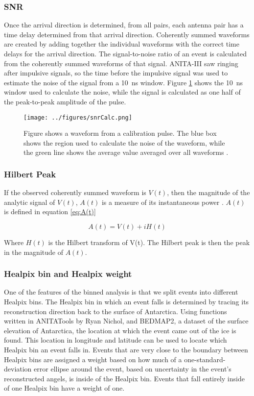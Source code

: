 \subsubsection{SNR}

Once the arrival direction is determined, from all pairs, each antenna pair has a time delay determined from that arrival direction.  Coherently summed waveforms are created by adding together the individual waveforms with the correct time delays for the arrival direction. The signal-to-noise ratio of an event is calculated from the coherently summed waveforms of that signal.  ANITA-III saw ringing after impulsive signals, so the time before the impulsive signal was used to estimate the noise of the signal from a 10~ns window.  Figure \ref{fig:snrCalc} shows the 10~ns window used to calculate the noise, while the signal is calculated as one half of the peak-to-peak amplitude of the pulse.

\begin{figure}[h]
\centering
\texttt{[image: ../figures/snrCalc.png]}
\caption[SNR Noise and Signal Sampling]{Figure shows a waveform from a calibration pulse.  The blue box shows the region used to calculate the noise of the waveform, while the green line shows the average value averaged over all waveforms \cite{sam}.}
\label{fig:snrCalc}
\end{figure}


\subsubsection{Hilbert Peak}

If the observed coherently summed waveform is $V(t)$, then the magnitude of the analytic signal of $V(t)$, $A(t)$ is a measure of its instantaneous power \cite{sam}.  $A(t)$ is defined in equation \ref{eq:A(t)}

\begin{equation} \label{eq:A(t)}
A(t) = V(t) + iH(t)
\end{equation}

Where $H(t)$ is the Hilbert transform of V(t).  The Hilbert peak is then the peak in the magnitude of $A(t)$.

\subsubsection{Healpix bin and Healpix weight}

One of the features of the binned analysis is that we split events into different Healpix bins.  The Healpix bin in which an event falls is determined by tracing its reconstruction direction back to the surface of Antarctica.  Using functions written in ANITATools by Ryan Nichol, and BEDMAP2, a dataset of the surface elevation of Antarctica, the location at which the event came out of the ice is found.  This location in longitude and latitude can be used to locate which Healpix bin an event falls in.  Events that are very close to the boundary between Healpix bins are assigned a weight based on how much of a one-standard-deviation error ellipse around the event, based on uncertainty in the event's reconstructed angels, is inside of the Healpix bin.  Events that fall entirely inside of one Healpix bin have a weight of one.  

